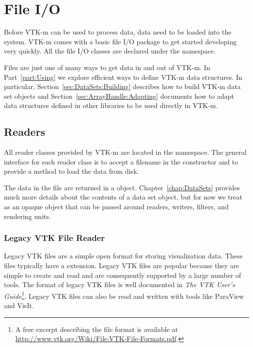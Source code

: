 \chapter{File I/O}
\label{chap:FileIO}


Before VTK-m can be used to process data, data need to be loaded into the
system. VTK-m comes with a basic file I/O package to get started developing
very quickly. All the file I/O classes are declared under the \vtkmio{}
namespace.

\begin{didyouknow}
  Files are just one of many ways to get data in and out of VTK-m. In
  Part~\ref{part:Using} we explore efficient ways to define VTK-m data
  structures. In particular, Section~\ref{sec:DataSets:Building} describes
  how to build VTK-m data set objects and
  Section~\ref{sec:ArrayHandle:Adapting} documents how to adapt data
  structures defined in other libraries to be used directly in VTK-m.
\end{didyouknow}

\section{Readers}


All reader classes provided by VTK-m are located in the \vtkmioreader{}
namespace. The general interface for each reader class is to accept a
filename in the constructor and to provide a  method
to load the data from disk.

The data in the file are returned in a  object.
Chapter~\ref{chap:DataSets} provides much more details about the contents of
a data set object, but for now we treat  as an
opaque object that can be passed around readers, writers, filters, and
rendering units.

\subsection{Legacy VTK File Reader}

Legacy VTK files are a simple open format for storing visualization data.
These files typically have a  extension. Legacy VTK
files are popular because they are simple to create and read and are
consequently supported by a large number of tools. The format of legacy VTK
files is well documented in \textit{The VTK User's Guide}\footnote{A free
  excerpt describing the file format is available at
  \url{http://www.vtk.org/Wiki/File:VTK-File-Formats.pdf}.}. Legacy VTK
files can also be read and written with tools like ParaView and VisIt.

